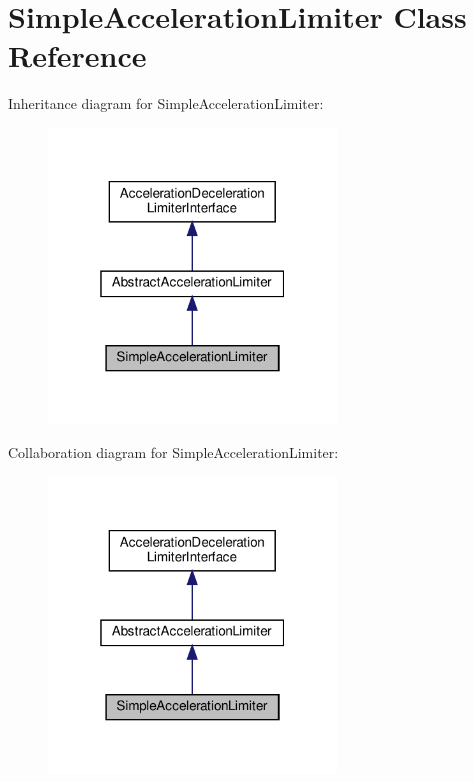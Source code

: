\hypertarget{classSimpleAccelerationLimiter}{}\section{Simple\+Acceleration\+Limiter Class Reference}
\label{classSimpleAccelerationLimiter}


Inheritance diagram for Simple\+Acceleration\+Limiter\+:
\nopagebreak
\begin{figure}[H]
\begin{center}
\leavevmode
\includegraphics[width=217pt]{classSimpleAccelerationLimiter__inherit__graph}
\end{center}
\end{figure}


Collaboration diagram for Simple\+Acceleration\+Limiter\+:
\nopagebreak
\begin{figure}[H]
\begin{center}
\leavevmode
\includegraphics[width=217pt]{classSimpleAccelerationLimiter__coll__graph}
\end{center}
\end{figure}
